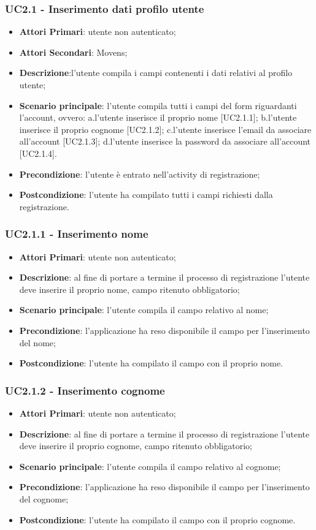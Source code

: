 \subsubsection{UC2.1 - Inserimento dati profilo utente}
\begin{itemize}
	\item \textbf{Attori Primari}: utente non autenticato;
	\item \textbf{Attori Secondari}: Movens\glo;
	\item \textbf{Descrizione}:l'utente compila i campi contenenti i dati relativi al profilo utente;
	\item \textbf{Scenario principale}: l'utente compila tutti i campi del form riguardanti l'account, ovvero:
	a.l'utente inserisce il proprio nome [UC2.1.1];
	b.l'utente inserisce il proprio cognome [UC2.1.2];
	c.l'utente inserisce l'email da associare all'account [UC2.1.3];
	d.l'utente inserisce la password da associare all'account [UC2.1.4].
	\item \textbf{Precondizione}: l'utente è entrato nell'activity di registrazione;
	\item \textbf{Postcondizione}: l'utente ha compilato tutti i campi richiesti dalla registrazione.
	
\end{itemize}
\subsubsection{UC2.1.1 - Inserimento nome}
\begin{itemize}
	\item \textbf{Attori Primari}: utente non autenticato;
	\item \textbf{Descrizione}: al fine di portare a termine il processo di registrazione l'utente deve inserire il proprio nome, campo ritenuto obbligatorio;
	\item \textbf{Scenario principale}: l'utente compila il campo relativo al nome;	
	\item \textbf{Precondizione}: l'applicazione ha reso disponibile il campo per l'inserimento del nome;
	\item \textbf{Postcondizione}: l'utente ha compilato il campo con il proprio nome.	
\end{itemize}
\subsubsection{UC2.1.2 - Inserimento cognome}
\begin{itemize}
	\item \textbf{Attori Primari}: utente non autenticato;
	\item \textbf{Descrizione}: al fine di portare a termine il processo di registrazione l'utente deve inserire il proprio cognome, campo ritenuto obbligatorio;
	\item \textbf{Scenario principale}: l'utente compila il campo relativo al cognome;	
	\item \textbf{Precondizione}: l'applicazione ha reso disponibile il campo per l'inserimento del cognome;
	\item \textbf{Postcondizione}: l'utente ha compilato il campo con il proprio cognome.	
\end{itemize}
